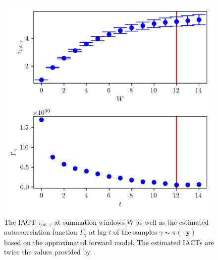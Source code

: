 \begin{figure}[ht!]
	\centering
	\includegraphics{UwerrTauIntSecO3gam.png}
	\caption[IACT and autocorrelation of samples $\gamma \sim \pi( \cdot| \bm{y})$, for approximated model.]{The IACT $\tau_{\text{int},\gamma}$ at summation windows W as well as the estimated autocorrelation function $\Gamma_{\gamma}$ at lag $t$ of the samples $\gamma \sim \pi( \cdot | \bm{y})$ based on the approximated forward model.
	The estimated IACTs are twice the values provided by~\cite{drikHesse, UwerrM}.}
	\label{fig:IATCSecO3gam}
\end{figure}
\clearpage
